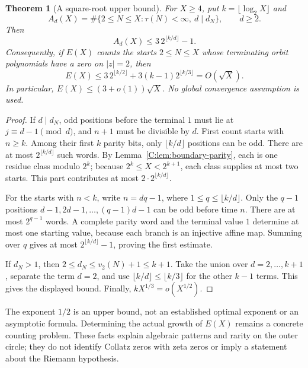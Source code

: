 \documentclass[11pt,a4paper]{article}
\newtheorem{theorem}{Theorem}[section]
\theoremstyle{definition}
\theoremstyle{remark}
\numberwithin{equation}{section}
\begin{document}
\begin{theorem}[A square-root upper bound]\label{C:thm:boundary-sqrt}
For $X\ge4$, put $k=\lfloor\log_2X\rfloor$ and
\[
 A_d(X)=\#\{2\le N\le X:\tau(N)<\infty,\ d\mid d_N\},
 \qquad d\ge2.
\]
Then
\[
 A_d(X)\le3\,2^{\lfloor k/d\rfloor}-1.
\]
Consequently, if $E(X)$ counts the starts $2\le N\le X$ whose
terminating orbit polynomials have a zero on $|z|=2$, then
\[
 \boxed{
 E(X)\le3\,2^{\lfloor k/2\rfloor}
       +3(k-1)2^{\lfloor k/3\rfloor}
       =O(\sqrt X).}
\]
In particular, $E(X)\le(3+o(1))\sqrt X$. No global convergence
assumption is used.
\end{theorem}

\begin{proof}
If $d\mid d_N$, odd positions before the terminal $1$ must lie at
$j\equiv d-1\pmod d$, and $n+1$ must be divisible by $d$.
First count starts with $n\ge k$. Among their first $k$ parity bits,
only $\lfloor k/d\rfloor$ positions can be odd. There are at most
$2^{\lfloor k/d\rfloor}$ such words. By
Lemma~\ref{C:lem:boundary-parity}, each is one residue class modulo $2^k$;
because $2^k\le X<2^{k+1}$, each class supplies at most two starts.
This part contributes at most $2\cdot2^{\lfloor k/d\rfloor}$.

For the starts with $n<k$, write $n=dq-1$, where
$1\le q\le\lfloor k/d\rfloor$. Only the $q-1$ positions
$d-1,2d-1,\ldots,(q-1)d-1$ can be odd before time $n$.
There are at most $2^{q-1}$ words. A complete parity word and the
terminal value $1$ determine at most one starting value, because each
branch is an injective affine map. Summing over $q$ gives at most
$2^{\lfloor k/d\rfloor}-1$, proving the first estimate.

If $d_N>1$, then $2\le d_N\le v_2(N)+1\le k+1$.
Take the union over $d=2,\ldots,k+1$, separate the term $d=2$,
and use $\lfloor k/d\rfloor\le\lfloor k/3\rfloor$ for the other
$k-1$ terms. This gives the displayed bound. Finally,
$kX^{1/3}=o(X^{1/2})$.
\end{proof}

The exponent $1/2$ is an upper bound, not an established optimal exponent
or an asymptotic formula. Determining the actual growth of $E(X)$ remains
a concrete counting problem. These facts explain algebraic patterns and
rarity on the outer circle; they do not identify Collatz zeros with zeta
zeros or imply a statement about the Riemann hypothesis.

\end{document}
